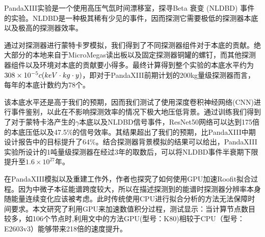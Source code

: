 
\pkuthssffaq %

PandaXIII实验是一个使用高压气氙时间漂移室，探寻 Beta 衰变 (NLDBD) 事件的实验。NLDBD是一种极其稀有少见的事件，因而探测它需要极低的探测器本底以及极高的探测器效率。

通过对探测器进行蒙特卡罗模拟，我们得到了不同探测器组件对于本底的贡献。绝大部分的本地来自于MicroMegas读出板以及固定探测器铜罐的螺钉，而其他探测器组件以及环境对本底的贡献要小得多。最终计算得到整个实验的本底水平约为$308\times 10^{-5}c\/(keV\cdot kg\cdot y)$，即对于PandaXIII前期计划的200kg量级探测器而言，每年的本底计数约为78个。

该本底水平还是高于我们的预期，因而我们测试了使用深度卷积神经网络(CNN)进行事件鉴别，以此在不影响探测效率的情况下极大地压低背景。通过训练我们得到了对于蒙特卡洛产生的$\gamma$本底以及NLDBD信号事件，ResNet50网络可以达到175倍的本底压低以及47.5\%的信号效率。其结果超出了我们的预期，比PandaXIII中期设计报告中的目标提升了64\%。结合探测器背景模拟的结果可以给出，PandaXIII实验所设计的1吨量级探测器在经过3年的取数后，可以将\xeots NLDBD事件半衰期下限提升至$1.6\times10^{27}$年。

在PandaXIII模拟以及重建工作外，作者也探究了如何使用GPU加速Roofit拟合过程。因为中微子本征能谱跨度较大，所以在描述探测到的能谱时探测器分辨率本身随能量连续变化应该被考虑。此时传统使用CPU进行拟合分析的方法无法保障时间要求。本文研究了利用GPU来加速数值积分过程，测试显示：当计算节点数目较多，如106个节点时,利用文中的方法GPU(型号：K80)相较于CPU（型号：E2603v3）能够带来218倍的速度提升。


